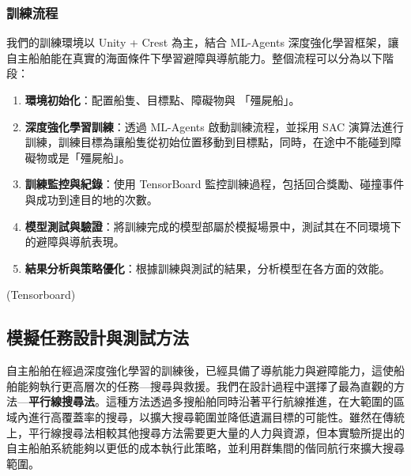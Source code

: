 \documentclass[12pt,a4paper]{article}
\begin{document}
\subsubsection{訓練流程}
我們的訓練環境以 Unity + Crest 為主，結合 ML-Agents 深度強化學習框架，讓自主船舶能在真實的海面條件下學習避障與導航能力。整個流程可以分為以下階段：
\begin{enumerate}
    \item \textbf{環境初始化}：配置船隻、目標點、障礙物與 「殭屍船」。
    \item \textbf{深度強化學習訓練}：透過 ML-Agents 啟動訓練流程，並採用 SAC 演算法進行訓練，訓練目標為讓船隻從初始位置移動到目標點，同時，在途中不能碰到障礙物或是「殭屍船」。
    \item \textbf{訓練監控與紀錄}：使用 TensorBoard 監控訓練過程，包括回合獎勵、碰撞事件與成功到達目的地的次數。
    \item \textbf{模型測試與驗證}：將訓練完成的模型部屬於模擬場景中，測試其在不同環境下的避障與導航表現。
    \item \textbf{結果分析與策略優化}：根據訓練與測試的結果，分析模型在各方面的效能。
\end{enumerate}

(Tensorboard)

\subsection{模擬任務設計與測試方法}
自主船舶在經過深度強化學習的訓練後，已經具備了導航能力與避障能力，這使船舶能夠執行更高層次的任務—搜尋與救援。我們在設計過程中選擇了最為直觀的方法—\textbf{平行線搜尋法}。這種方法透過多搜船舶同時沿著平行航線推進，在大範圍的區域內進行高覆蓋率的搜尋，以擴大搜尋範圍並降低遺漏目標的可能性。雖然在傳統上，平行線搜尋法相較其他搜尋方法需要更大量的人力與資源，但本實驗所提出的自主船舶系統能夠以更低的成本執行此策略，並利用群集間的偕同航行來擴大搜尋範圍。
\end{document}
